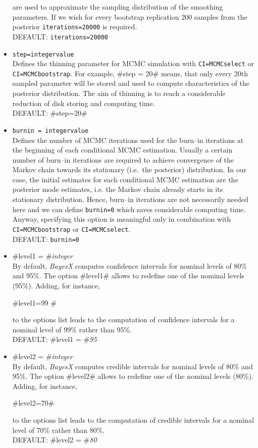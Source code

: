 \begin{itemize}
are used  to approximate the sampling
distribution of the smoothing parameters. If we wish for every bootstrap replication 200 samples from the posterior
{\tt iterations=20000} is required.     \\
DEFAULT: {\tt iterations=20000}
\item {\tt step=integervalue} \\
Defines the thinning parameter for MCMC simulation with {\tt CI=MCMCselect} or {\tt CI=MCMCbootstrap}. For example,
#step = 20# means, that only every 20th sampled parameter will be
stored and used to compute characteristics of the posterior
distribution. The aim of thinning is to reach a considerable reduction of disk storing and computing time.\\
DEFAULT: #step=20#
\item {\tt burnin = integervalue} \\
Defines the number of MCMC iterations used for the burn--in iterations
at the beginning of each conditional MCMC estimation.
Usually a certain number of burn--in iterations are required
to achieve convergence of the Markov chain towards its stationary (i.e.~the posterior) distribution.
In our case, the initial estimates for each conditional MCMC estimation are the posterior mode estimates, i.e.
the Markov chain already starts in its stationary distribution.
Hence,  burn--in iterations are not necessarily  needed here and we can define {\tt burnin=0} which
saves considerable computing time.
Anyway, specifying this option is meaningful only in combination with {\tt CI=MCMCbootstrap} or {\tt CI=MCMCselect}. \\
DEFAULT: {\tt burnin=0}
\item \label{stepwisereglevel1} #level1 = #{\em integer} \\
By default, {\em BayesX} computes confidence intervals for
nominal levels of 80\% and 95\%. The option #level1# allows to
redefine one of the nominal levels (95\%). Adding, for instance,

#level1=99 #

to the options list leads to the computation of confidence intervals
for a nominal level of 99\% rather than 95\%. \\
DEFAULT: #level1 = #{\em 95}
\item \label{stepwisereglevel2} #level2 = #{\em integer} \\
By default, {\em BayesX} computes credible intervals for
nominal levels of 80\% and 95\%. The option #level2# allows to
redefine one of the nominal levels (80\%). Adding, for instance,

#level2=70#

to the options list leads to the computation of credible intervals
for a nominal level of 70\% rather than 80\%. \\
DEFAULT: #level2 = #{\em 80}
\end{itemize}



